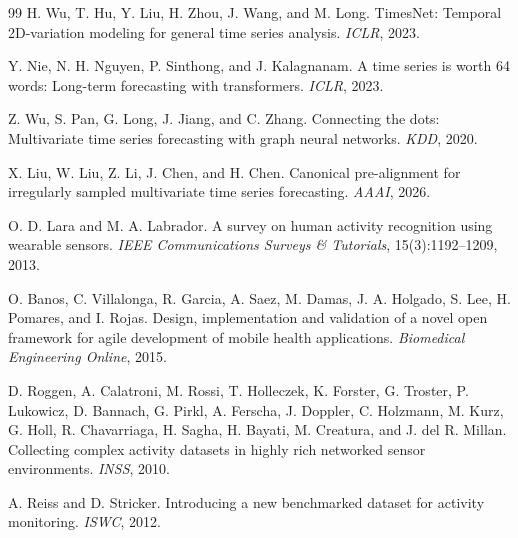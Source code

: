 ﻿\documentclass[10pt,conference]{IEEEtran}
\begin{document}
\begin{thebibliography}{99}
H. Wu, T. Hu, Y. Liu, H. Zhou, J. Wang, and M. Long.
TimesNet: Temporal 2D-variation modeling for general time series analysis.
\emph{ICLR}, 2023.

Y. Nie, N. H. Nguyen, P. Sinthong, and J. Kalagnanam.
A time series is worth 64 words: Long-term forecasting with transformers.
\emph{ICLR}, 2023.

Z. Wu, S. Pan, G. Long, J. Jiang, and C. Zhang.
Connecting the dots: Multivariate time series forecasting with graph neural
networks.
\emph{KDD}, 2020.

X. Liu, W. Liu, Z. Li, J. Chen, and H. Chen.
Canonical pre-alignment for irregularly sampled multivariate time series
forecasting.
\emph{AAAI}, 2026.

O. D. Lara and M. A. Labrador.
A survey on human activity recognition using wearable sensors.
\emph{IEEE Communications Surveys \& Tutorials}, 15(3):1192--1209, 2013.

O. Banos, C. Villalonga, R. Garcia, A. Saez, M. Damas, J. A. Holgado,
S. Lee, H. Pomares, and I. Rojas.
Design, implementation and validation of a novel open framework for agile
development of mobile health applications.
\emph{Biomedical Engineering Online}, 2015.

D. Roggen, A. Calatroni, M. Rossi, T. Holleczek, K. Forster, G. Troster,
P. Lukowicz, D. Bannach, G. Pirkl, A. Ferscha, J. Doppler, C. Holzmann,
M. Kurz, G. Holl, R. Chavarriaga, H. Sagha, H. Bayati, M. Creatura, and
J. del R. Millan.
Collecting complex activity datasets in highly rich networked sensor
environments.
\emph{INSS}, 2010.

A. Reiss and D. Stricker.
Introducing a new benchmarked dataset for activity monitoring.
\emph{ISWC}, 2012.

\end{thebibliography}
\end{document}
